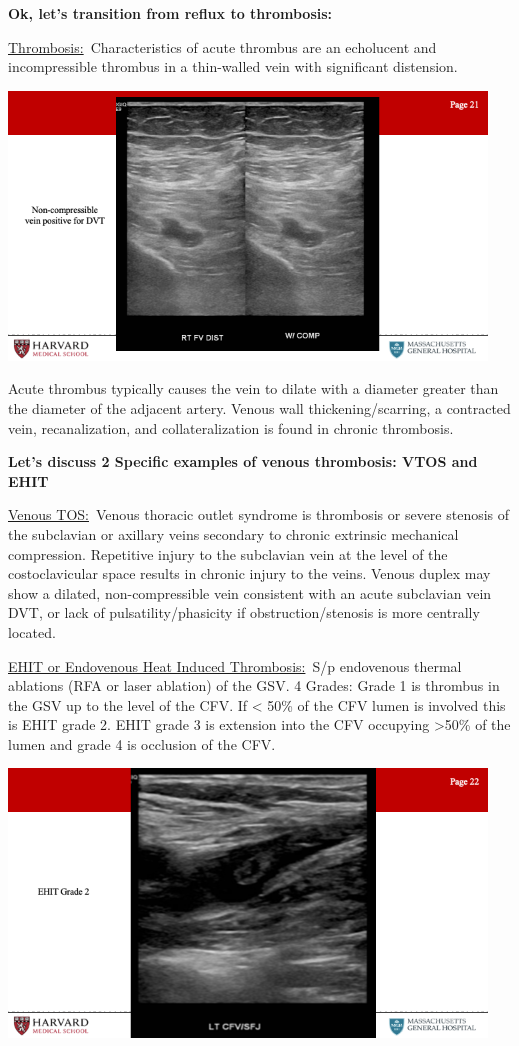 \documentclass[
]{book}
\begin{document}
\textbf{Ok, let's transition from reflux to thrombosis:}

\underline{Thrombosis:}~Characteristics of acute thrombus are an echolucent
and incompressible thrombus in a thin-walled vein with significant
distension.

\includegraphics[width=5in]{images/vasc_lab/Slide22}

Acute thrombus typically causes the vein to dilate with a diameter
greater than the diameter of the adjacent artery. Venous wall
thickening/scarring, a contracted vein, recanalization, and
collateralization is found in chronic thrombosis.

\textbf{Let's discuss 2 Specific examples of venous thrombosis: VTOS and
EHIT}

\underline{Venous TOS:}~Venous thoracic outlet syndrome is thrombosis or
severe stenosis of the subclavian or axillary veins secondary to chronic
extrinsic mechanical compression. Repetitive injury to the subclavian
vein at the level of the costoclavicular space results in chronic injury
to the veins. Venous duplex may show a dilated, non-compressible vein
consistent with an acute subclavian vein DVT, or lack of
pulsatility/phasicity if obstruction/stenosis is more centrally located.

\underline{EHIT or Endovenous Heat Induced Thrombosis:}~S/p endovenous
thermal ablations (RFA or laser ablation) of the GSV. 4 Grades: Grade 1
is thrombus in the GSV up to the level of the CFV. If \textless{} 50\% of the CFV
lumen is involved this is EHIT grade 2. EHIT grade 3 is extension into
the CFV occupying \textgreater50\% of the lumen and grade 4 is occlusion of the
CFV.

\includegraphics[width=5in]{images/vasc_lab/Slide23}
\end{document}
